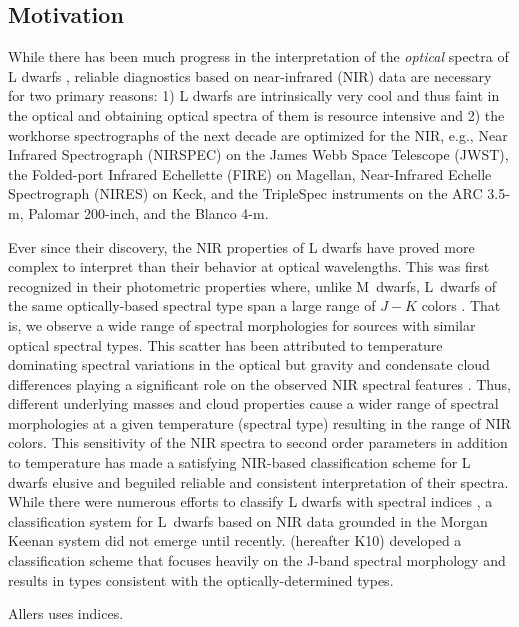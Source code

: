 \documentclass[12pt,preprint]{aastex}
\begin{document}
\subsection{Motivation}
While there has been much progress in the interpretation of the \emph{optical} spectra of L dwarfs \citep{K99,Cruz09_lowg}, reliable diagnostics based on near-infrared (NIR) data are necessary for two primary reasons:
1) L dwarfs are intrinsically very cool and thus faint in the optical and obtaining optical spectra of them is resource intensive and 
2) the workhorse spectrographs of the next decade are optimized for the NIR, e.g., Near Infrared Spectrograph (NIRSPEC) on the James Webb Space Telescope (JWST), the Folded-port Infrared Echellette (FIRE) on Magellan, Near-Infrared Echelle Spectrograph (NIRES) on Keck, and the TripleSpec instruments on the ARC 3.5-m, Palomar 200-inch, and the Blanco 4-m.

Ever since their discovery, the NIR properties of L dwarfs have proved more complex to interpret than their behavior at optical wavelengths. 
This was first recognized in their photometric properties where, unlike M~dwarfs, L~dwarfs of the same optically-based spectral type span a large range of $J-K$ colors \citep[e.g.,]{Leggett:2003tm}. 
That is, we observe a wide range of spectral morphologies for sources with similar optical spectral types.
This scatter has been attributed to temperature dominating spectral variations in the optical but gravity and condensate cloud differences playing a significant role on the observed NIR spectral features \citep{Knapp04}.
Thus, different underlying masses and cloud properties cause a wider range of spectral morphologies at a given temperature (spectral type) resulting in the range of NIR colors. 
This sensitivity of the NIR spectra to second order parameters in addition to temperature has made a satisfying NIR-based classification scheme for L dwarfs elusive and beguiled reliable and consistent interpretation of their spectra.
While there were numerous efforts to classify L dwarfs with spectral indices \citep{Reid01_NIR, Testi01, Geballe02}, a classification system for L~dwarfs based on NIR data grounded in the Morgan Keenan system did not emerge until recently. \citet{Kirkpatrick10} (hereafter K10) developed a classification scheme that focuses heavily on the J-band spectral morphology and results in types consistent with the optically-determined types. 

Allers uses indices.
\end{document}
